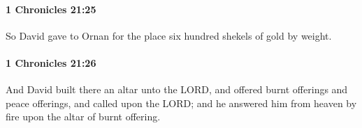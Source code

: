 		\paragraph{1 Chronicles 21:25} %
			\label{1CHRONICLES-21-25}

			So David gave to Ornan for the place six hundred shekels of gold by weight.


		\paragraph{1 Chronicles 21:26} %
			\label{1CHRONICLES-21-26}

			And David built there an altar unto the LORD, and offered burnt offerings and peace offerings, and called upon the LORD; and he answered him from heaven by fire upon the altar of burnt offering.


